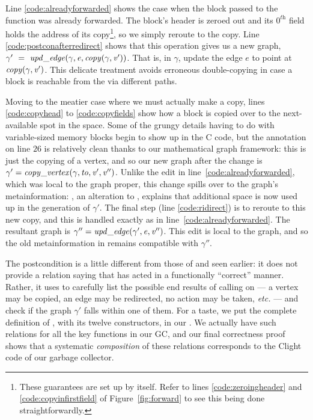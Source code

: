 Line \ref{code:alreadyforwarded} shows
the case when the block  passed to the function was already forwarded.
The block's header is zeroed out and its $0^\textit{th}$ field holds
the address of its
copy\footnote{These guarantees are set up by  itself.
Refer to lines \ref{code:zeroingheader} and
\ref{code:copyinfirstfield} of Figure~\ref{fig:forward} to see this being done straightforwardly.},
so we simply reroute to the copy. 
Line \ref{code:postconafterredirect} shows that this operation
gives us a new graph, 
$\gamma'~=~\mathit{upd\_edge}(\gamma, \mathit{e}, \mathit{copy}(\gamma, \mathit{v'}))$.
That is, in $\gamma$, update the edge $e$ to point at
$\mathit{copy}(\gamma, \mathit{v'})$. 
This delicate treatment avoids erroneous double-copying
in case a block is reachable from the  via different paths.

Moving to the meatier case where we must actually make a copy,
lines \ref{code:copyhead} to \ref{code:copyfields} show
how a block is copied over to the next-available spot in the
 space. Some of the grungy details having to do with
variable-sized memory blocks begin to show up in the C code,
but the annotation on line $26$ is relatively clean
thanks to our mathematical graph framework:
this is just the copying of a vertex, and so our new graph after the change is
$\gamma' = \mathit{copy\_vertex}(\gamma, \mathit{to}, \mathit{v'}, \mathit{v''})$.
Unlike the edit in line~\ref{code:alreadyforwarded}, which was
local to the graph proper, this
change spills over to the graph's metainformation: 
, an alteration to , explains that additional 
space is now used up in the  generation of $\gamma'$. 
The final step (line \ref{code:ridirect}) is to reroute to this
new copy, and this is handled exactly as in line~\ref{code:alreadyforwarded}. 
The resultant graph is $\gamma'' = \mathit{upd\_edge}(\gamma', \mathit{e}, \mathit{v''})$. 
This edit is local to the graph, and so the old metainformation in 
 remains compatible with $\gamma''$.

The postcondition is a little different from those of 
and  seen earlier: it does not provide a relation
saying that  has acted in a functionally ``correct'' manner. 
Rather, it uses  to carefully list the possible 
end results of calling
 on  --- a vertex may be copied, an edge may be redirected, 
no action may be taken, \emph{etc.} --- and check if the graph
$\gamma'$ falls within one of them.
For a taste, we put the complete definition
of , with its twelve constructors, 
in our .
We actually have such relations for all the key functions in our GC, 
and our final correctness proof shows that a 
systematic \emph{composition} of these relations corresponds to the 
Clight code of our garbage collector. 


